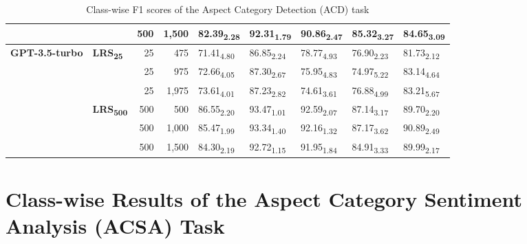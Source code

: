 \begin{table}[h]
{{\begin{tabular}{llrrlllll}
 &  & 500 & 1,500 & 82.39\textsubscript{2.28} &92.31\textsubscript{1.79} &90.86\textsubscript{2.47} &85.32\textsubscript{3.27} &84.65\textsubscript{3.09}  \\
\hline
\multirow{6}{*}{\textbf{GPT-3.5-turbo}} & \multirow{3}{*}{\textbf{LRS\textsubscript{25}}} & 25 & 475 & 71.41\textsubscript{4.80} &86.85\textsubscript{2.24} &78.77\textsubscript{4.93} &76.90\textsubscript{2.23} &81.73\textsubscript{2.12}  \\
 &  & 25 & 975 & 72.66\textsubscript{4.05} &87.30\textsubscript{2.67} &75.95\textsubscript{4.83} &74.97\textsubscript{5.22} &83.14\textsubscript{4.64}  \\
 &  & 25 & 1,975 & 73.61\textsubscript{4.01} &87.23\textsubscript{2.82} &74.61\textsubscript{3.61} &76.88\textsubscript{4.99} &83.21\textsubscript{5.67}  \\
\arrayrulecolor{gray}\cline{2-9}\arrayrulecolor{black}
 & \multirow{3}{*}{\textbf{LRS\textsubscript{500}}} & 500 & 500 & 86.55\textsubscript{2.20} &93.47\textsubscript{1.01} &92.59\textsubscript{2.07} &87.14\textsubscript{3.17} &89.70\textsubscript{2.20}  \\
 &  & 500 & 1,000 & 85.47\textsubscript{1.99} &93.34\textsubscript{1.40} &92.16\textsubscript{1.32} &87.17\textsubscript{3.62} &90.89\textsubscript{2.49}  \\
 &  & 500 & 1,500 & 84.30\textsubscript{2.19} &92.72\textsubscript{1.15} &91.95\textsubscript{1.84} &84.91\textsubscript{3.33} &89.99\textsubscript{2.17}  \\
\hline
\end{tabular}
}
}
\caption{Class-wise F1 scores of the Aspect Category Detection (ACD) task}
\end{table}


\section{Class-wise Results of the Aspect Category Sentiment Analysis (ACSA) Task}\label{appendix:acsa-performance}

